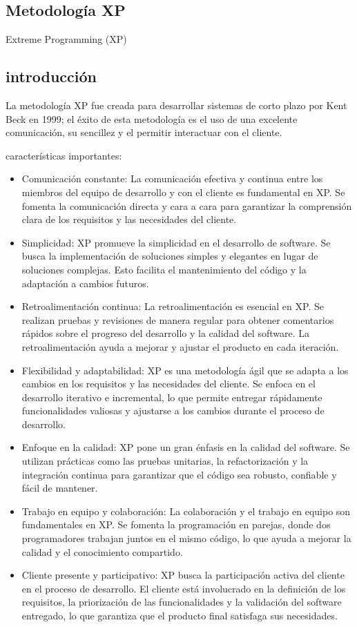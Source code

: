 \documentclass[12pt,a4paper]{article}
\newcommand{\espacio}{\par\vspace{3mm}}
\newcommand{\newsubsection}[1]{\subsection{\hspace{4mm} #1}}
\begin{document}
\newsubsection{Metodología XP}
Extreme Programming (XP)
\subsection*{introducción}
La metodología XP fue creada para desarrollar sistemas de corto plazo por Kent Beck en 1999; el éxito de esta metodología es el uso de una excelente comunicación, su sencillez y el permitir interactuar con el cliente.
\espacio
características importantes:
\begin{itemize}
    \item Comunicación constante: La comunicación efectiva y continua entre los miembros del equipo de desarrollo y con el cliente es fundamental en XP. Se fomenta la comunicación directa y cara a cara para garantizar la comprensión clara de los requisitos y las necesidades del cliente.
    \item Simplicidad: XP promueve la simplicidad en el desarrollo de software. Se busca la implementación de soluciones simples y elegantes en lugar de soluciones complejas. Esto facilita el mantenimiento del código y la adaptación a cambios futuros.
    \item Retroalimentación continua: La retroalimentación es esencial en XP. Se realizan pruebas y revisiones de manera regular para obtener comentarios rápidos sobre el progreso del desarrollo y la calidad del software. La retroalimentación ayuda a mejorar y ajustar el producto en cada iteración.
    \item Flexibilidad y adaptabilidad: XP es una metodología ágil que se adapta a los cambios en los requisitos y las necesidades del cliente. Se enfoca en el desarrollo iterativo e incremental, lo que permite entregar rápidamente funcionalidades valiosas y ajustarse a los cambios durante el proceso de desarrollo.
    \item Enfoque en la calidad: XP pone un gran énfasis en la calidad del software. Se utilizan prácticas como las pruebas unitarias, la refactorización y la integración continua para garantizar que el código sea robusto, confiable y fácil de mantener.
    \item Trabajo en equipo y colaboración: La colaboración y el trabajo en equipo son fundamentales en XP. Se fomenta la programación en parejas, donde dos programadores trabajan juntos en el mismo código, lo que ayuda a mejorar la calidad y el conocimiento compartido.
    \item Cliente presente y participativo: XP busca la participación activa del cliente en el proceso de desarrollo. El cliente está involucrado en la definición de los requisitos, la priorización de las funcionalidades y la validación del software entregado, lo que garantiza que el producto final satisfaga sus necesidades.
\end{itemize}
\end{document}
